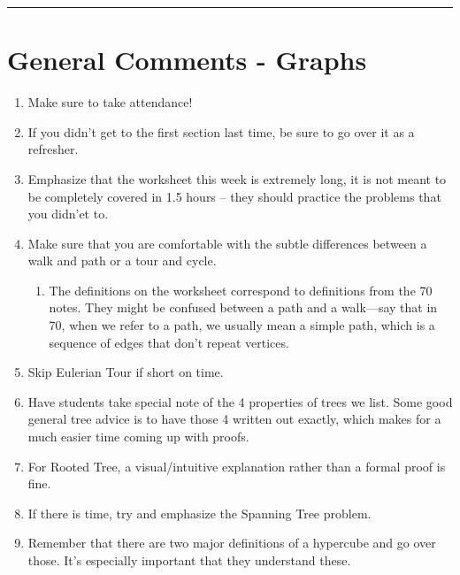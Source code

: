 \documentclass{exam}
\title{}
\date{Graphs, Trees, Hypercubes, Bijections, FLT, Modular Arithmetic}
\begin{document}
\maketitle
\rule{\textwidth}{0.15em}
\fontsize{12}{15}\selectfont
\thispagestyle{empty}


\section{General Comments - Graphs}
\begin{enumerate}
\item Make sure to take attendance!
\item If you didn't get to the first section last time, be sure to go over it as a refresher.
\item Emphasize that the worksheet this week is extremely long, it is not meant to be completely covered in 1.5 hours -- they should practice the problems that you didn’et to.
\item Make sure that you are comfortable with the subtle differences between a walk and path or a tour and cycle. 
\begin{enumerate}
	\item The definitions on the worksheet correspond to definitions from the 70 notes. They might be confused between a path and a walk---say that in 70, when we refer to a path, we usually mean a simple path, which is a sequence of edges that don't repeat vertices. 
\end{enumerate}
\item Skip Eulerian Tour if short on time.
\item Have students take special note of the 4 properties of trees we list. Some good general tree advice is to have those 4 written out exactly, which makes for a much easier time coming up with proofs.
\item For Rooted Tree, a visual/intuitive explanation rather than a formal proof is fine. 
\item If there is time, try and emphasize the Spanning Tree problem.
\item Remember that there are two major definitions of a hypercube and go over those. It's especially important that they understand these. 
 
\end{enumerate}
\end{document}
